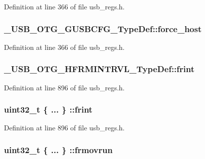 Definition at line 366 of file usb\-\_\-regs.\-h.

\hypertarget{group___u_s_b___o_t_g___d_r_i_v_e_r_ga1f36d10fc1b42a0a698de7c934f2e0e7}{
\subsubsection[{force\-\_\-host}]{ \-\_\-\-U\-S\-B\-\_\-\-O\-T\-G\-\_\-\-G\-U\-S\-B\-C\-F\-G\-\_\-\-Type\-Def\-::force\-\_\-host}}\label{group___u_s_b___o_t_g___d_r_i_v_e_r_ga1f36d10fc1b42a0a698de7c934f2e0e7}


Definition at line 366 of file usb\-\_\-regs.\-h.

\hypertarget{group___u_s_b___o_t_g___d_r_i_v_e_r_ga6710e8bdf4a117215581628f7cf8ad57}{
\subsubsection[{frint}]{ \-\_\-\-U\-S\-B\-\_\-\-O\-T\-G\-\_\-\-H\-F\-R\-M\-I\-N\-T\-R\-V\-L\-\_\-\-Type\-Def\-::frint}}\label{group___u_s_b___o_t_g___d_r_i_v_e_r_ga6710e8bdf4a117215581628f7cf8ad57}


Definition at line 896 of file usb\-\_\-regs.\-h.

\hypertarget{group___u_s_b___o_t_g___d_r_i_v_e_r_gac8895793a8d97804a7c096754edb878e}{
\subsubsection[{frint}]{\setlength{\rightskip}{0pt plus 5cm}uint32\-\_\-t \{ ... \} \-::frint}}\label{group___u_s_b___o_t_g___d_r_i_v_e_r_gac8895793a8d97804a7c096754edb878e}


Definition at line 896 of file usb\-\_\-regs.\-h.

\hypertarget{group___u_s_b___o_t_g___d_r_i_v_e_r_ga573c26b52fbf31ff5580e11a44ae6603}{
\subsubsection[{frmovrun}]{\setlength{\rightskip}{0pt plus 5cm}uint32\-\_\-t \{ ... \} \-::frmovrun}}\label{group___u_s_b___o_t_g___d_r_i_v_e_r_ga573c26b52fbf31ff5580e11a44ae6603}


